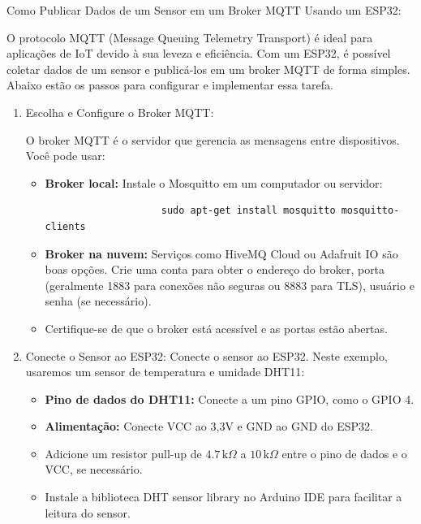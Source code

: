 \documentclass[a4paper]{article}
\begin{document}
    \begin{answer}
        Como Publicar Dados de um Sensor em um Broker MQTT Usando um ESP32:

        O protocolo MQTT (Message Queuing Telemetry Transport) é ideal para aplicações de IoT devido à sua leveza e eficiência. Com um ESP32, é possível coletar dados de um sensor e publicá-los em um broker MQTT de forma simples. Abaixo estão os passos para configurar e implementar essa tarefa.

        \begin{enumerate}
            \item Escolha e Configure o Broker MQTT:
            
            O broker MQTT é o servidor que gerencia as mensagens entre dispositivos. Você pode usar:
                \begin{itemize}
                    \item \textbf{Broker local:} Instale o Mosquitto em um computador ou servidor:
                    \begin{verbatim}
                    sudo apt-get install mosquitto mosquitto-clients
                    \end{verbatim}
                    \item \textbf{Broker na nuvem:} Serviços como HiveMQ Cloud ou Adafruit IO são boas opções. Crie uma conta para obter o endereço do broker, porta (geralmente 1883 para conexões não seguras ou 8883 para TLS), usuário e senha (se necessário).
                    \item Certifique-se de que o broker está acessível e as portas estão abertas.
                \end{itemize}
            
            \item Conecte o Sensor ao ESP32:
            Conecte o sensor ao ESP32. Neste exemplo, usaremos um sensor de temperatura e umidade DHT11:
            \begin{itemize}
                \item \textbf{Pino de dados do DHT11:} Conecte a um pino GPIO, como o GPIO 4.
                \item \textbf{Alimentação:} Conecte VCC ao 3,3V e GND ao GND do ESP32.
                \item Adicione um resistor pull-up de $4.7\,\mathrm{k}\Omega$ a $10\,\mathrm{k}\Omega$ entre o pino de dados e o VCC, se necessário.
                \item Instale a biblioteca DHT sensor library no Arduino IDE para facilitar a leitura do sensor.
            \end{itemize}


\end{enumerate}
\end{answer}
\end{document}

